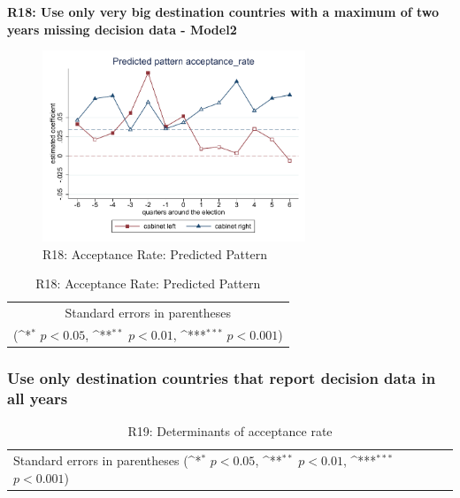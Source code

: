 \documentclass[10pt,a4paper]{scrartcl}
\begin{document}
\clearpage
\textbf{R18: Use only very big destination countries with a maximum of two years missing decision data - Model2}
\begin{figure}[!ht]
	\centering
	\includegraphics[width=0.7\textwidth]{figures_edited/acceptance_rate_graph2_R18.pdf}
	\caption{R18: Acceptance Rate: Predicted Pattern}
\end{figure}

\begin{table}[!ht]\centering
	\footnotesize
	\renewcommand{\arraystretch}{1.15}
	\def\sym#1{\ifmmode^{#1}\else\(^{#1}\)\fi}
	\caption{R18: Acceptance Rate: Predicted Pattern}
	\begin{tabular}{l*{2}{c}}
		\hline\hline
		
		\hline\hline
		\multicolumn{3}{c}{\footnotesize Standard errors in parentheses} \\
		\multicolumn{3}{c}{\footnotesize (\sym{*} \(p<0.05\), \sym{**} \(p<0.01\), \sym{***} \(p<0.001\))} \\
	\end{tabular}
\end{table}



\clearpage
\FloatBarrier
\subsubsection{Use only destination countries that report decision data in all years}
\begin{table}[!ht]\centering
	\renewcommand{\arraystretch}{1.25}
	\small
	\def\sym#1{\ifmmode^{#1}\else\(^{#1}\)\fi}
	\caption{R19: Determinants of acceptance rate}
	\begin{tabular}{l*{3}{c}}
		\hline\hline
		
		\hline\hline
		\multicolumn{4}{l}{\footnotesize Standard errors in parentheses (\sym{*} \(p<0.05\), \sym{**} \(p<0.01\), \sym{***} \(p<0.001\))}\\
	\end{tabular}
\end{table}
\end{document}
